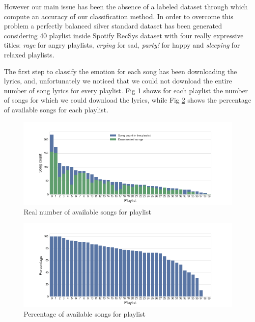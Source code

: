 However our main issue has been the absence of a labeled dataset through which compute an accuracy of our classification method. In order to overcome this problem a perfectly balanced silver standard dataset has been generated considering 40 playlist inside Spotify RecSys dataset with four really expressive titles: \textit{rage} for angry playlists, \textit{crying} for sad, \textit{party!} for happy and \textit{sleeping} for relaxed playlists. \par

The first step to classify the emotion for each song has been downloading the lyrics, and, unfortunately we noticed that we could not download the entire number of song lyrics for every playlist. Fig \ref{fig:rsongs} shows for each playlist the number of songs for which we could download the lyrics, while Fig \ref{fig:psongs} shows the percentage of available songs for each playlist. 

\begin{figure}[H]
\centering
\includegraphics[width=1\textwidth]{./chapters/chapter6/images/silver_standard_available_songs.png}
\caption{Real number of available songs for playlist}
\label{fig:rsongs}
\end{figure}

\begin{figure}[H]
\centering
\includegraphics[width=1\textwidth]{./chapters/chapter6/images/silver_standard_percentage_available_songs.png}
\caption{Percentage of available songs for playlist}
\label{fig:psongs}
\end{figure}

